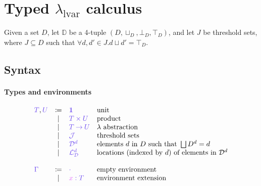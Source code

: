 \documentclass[main.tex]{subfiles}
\begin{document}
\section{Typed $\lambda_{\text{lvar}}$ calculus}

Given a set $D$, let $\mathbb{D}$ be a 4-tuple $(D, \sqcup_{D}, \bot_{D},
\top_{D})$, and let $J$ be threshold sets, where $J \subseteq D$ such that  
$\forall d, d' \in J. d \sqcup d' = \top_{D}$.

\subsection{Syntax}
\label{sec:llam-syntax}

\paragraph{Types and environments}
\[
\begin{array}{lcll}
  \ty{T}, \ty{U}
  & \coloneqq & \ty{\tyunit}        & \text{unit} \\
  & \sep      & \ty{\typrod{T}{U}}  & \text{product} \\
  & \sep      & \ty{\tyfun{T}{U}}   & \lambda \text{ abstraction}\\
  & \sep      & \ty{\tyJ}           & \text{threshold sets} \\
  & \sep      & \ty{\tyD{d}}        & \text{elements } d \text{ in } D \text{ such
                                      that } \bigsqcup D^{d} = d \\
  & \sep      & \ty{\tyL{d}}        & \text{locations (indexed by } d \text{) of
                                      elements in } \tyD{d}\\
  \\
  \ty{\Gamma}
  & \coloneqq & \ty{\emptyenv}                 & \text{empty environment}\\
  & \sep      & \ty{\tmty{x}{T}}               & \text{environment extension} \\
\end{array}
\]

\end{document}
